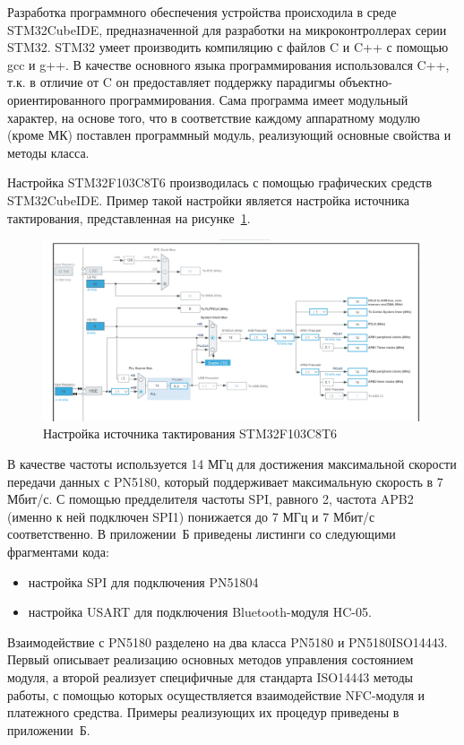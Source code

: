 Разработка программного обеспечения устройства происходила в среде STM32CubeIDE, предназначенной для разработки на микроконтроллерах серии STM32.
STM32 умеет производить компиляцию с файлов C и C++ с помощью gcc и g++.
В качестве основного языка программирования использовался C++, т.к. в отличие от C он предоставляет поддержку парадигмы объектно-ориентированного программирования.
Сама программа имеет модульный характер, на основе того, что в соответствие каждому аппаратному модулю (кроме МК) поставлен программный модуль, реализующий основные свойства и методы класса.

Настройка STM32F103C8T6 производилась с помощью графических средств STM32CubeIDE.
Пример такой настройки является настройка источника тактирования, представленная на рисунке~\ref{fig:stm_cube}.

\begin{figure}[h]
    \centering
    \includegraphics[width=1\textwidth]{images/design/stm_cube}
    \caption{\centering Настройка источника тактирования STM32F103C8T6}
    \label{fig:stm_cube}
\end{figure}

В качестве частоты используется 14 МГц для достижения максимальной скорости передачи данных с PN5180, который поддерживает максимальную скорость в 7 Мбит/с.
С помощью предделителя частоты SPI, равного 2, частота APB2 (именно к ней подключен SPI1) понижается до 7 МГц и 7 Мбит/с соответственно.
В приложении~Б приведены листинги со следующими фрагментами кода:
\begin{itemize}
    \item настройка SPI для подключения PN51804
    \item настройка USART для подключения Bluetooth-модуля HC-05.
\end{itemize}

Взаимодействие с PN5180 разделено на два класса PN5180 и PN5180ISO14443.
Первый описывает реализацию основных методов управления состоянием модуля, а второй реализует специфичные для стандарта ISO14443 методы работы, с помощью которых осуществляется взаимодействие NFC-модуля и платежного средства.
Примеры реализующих их процедур приведены в приложении~Б.


